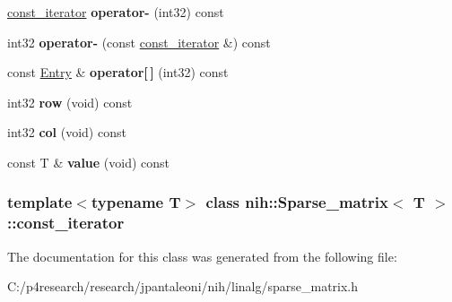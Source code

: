 \begin{DoxyCompactItemize}
\item 
\hypertarget{classnih_1_1_sparse__matrix_1_1const__iterator_a3763f7c8ac155bbcf12926766542fec7}{
\hyperlink{classnih_1_1_sparse__matrix_1_1const__iterator}{const\-\_\-iterator} {\bfseries operator-\/} (int32) const }
\label{classnih_1_1_sparse__matrix_1_1const__iterator_a3763f7c8ac155bbcf12926766542fec7}

\item 
\hypertarget{classnih_1_1_sparse__matrix_1_1const__iterator_ae4b690f384a44a00455e988992963579}{
int32 {\bfseries operator-\/} (const \hyperlink{classnih_1_1_sparse__matrix_1_1const__iterator}{const\-\_\-iterator} \&) const }
\label{classnih_1_1_sparse__matrix_1_1const__iterator_ae4b690f384a44a00455e988992963579}

\item 
\hypertarget{classnih_1_1_sparse__matrix_1_1const__iterator_a8d88fd62df9a8e52d5c966e67b5384ef}{
const \hyperlink{structnih_1_1_sparse__matrix__entry}{\-Entry} \& {\bfseries operator\mbox{[}$\,$\mbox{]}} (int32) const }
\label{classnih_1_1_sparse__matrix_1_1const__iterator_a8d88fd62df9a8e52d5c966e67b5384ef}

\item 
\hypertarget{classnih_1_1_sparse__matrix_1_1const__iterator_a73a4643743c80473a2fc70d9cebad67e}{
int32 {\bfseries row} (void) const }
\label{classnih_1_1_sparse__matrix_1_1const__iterator_a73a4643743c80473a2fc70d9cebad67e}

\item 
\hypertarget{classnih_1_1_sparse__matrix_1_1const__iterator_a08a738d2e1bfe3808120dc033607010a}{
int32 {\bfseries col} (void) const }
\label{classnih_1_1_sparse__matrix_1_1const__iterator_a08a738d2e1bfe3808120dc033607010a}

\item 
\hypertarget{classnih_1_1_sparse__matrix_1_1const__iterator_aeb38203a6cbdf947d9fe3546bd90973a}{
const \-T \& {\bfseries value} (void) const }
\label{classnih_1_1_sparse__matrix_1_1const__iterator_aeb38203a6cbdf947d9fe3546bd90973a}

\end{DoxyCompactItemize}
\subsubsection*{template$<$typename \-T$>$ class nih\-::\-Sparse\-\_\-matrix$<$ T $>$\-::const\-\_\-iterator}



\-The documentation for this class was generated from the following file\-:\begin{DoxyCompactItemize}
\item 
\-C\-:/p4research/research/jpantaleoni/nih/linalg/sparse\-\_\-matrix.\-h\end{DoxyCompactItemize}
